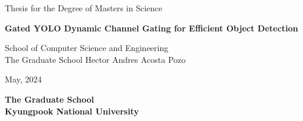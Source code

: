\begin{titlepage}
    \begin{center}
    	\textmd{\large Thesis for the Degree of Masters in Science}  
        \vfill

        \textbf{\fontsize{21}{11}\selectfont Gated YOLO Dynamic Channel Gating for Efficient Object Detection}  
        \vfill
        
        \textnormal{\large School of Computer Science and Engineering\\ The Graduate School          } 
        \vfill
        \textnormal{\Large Hector Andres Acosta Pozo}
        \vfill
        \vfill
        
        
        \textnormal{\large May, 2024}
        
        \textbf{\Large The Graduate School \\ Kyungpook National University}
        \vfill
    \end{center}
\end{titlepage}